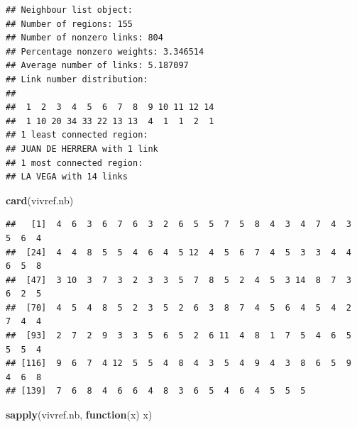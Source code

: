 \documentclass[11pt,]{article}
\newenvironment{Shaded}{\begin{snugshade}}{\end{snugshade}}
\newcommand{\KeywordTok}[1]{\textcolor[rgb]{0.13,0.29,0.53}{\textbf{#1}}}
\newcommand{\ControlFlowTok}[1]{\textcolor[rgb]{0.13,0.29,0.53}{\textbf{#1}}}
\newcommand{\NormalTok}[1]{#1}
\begin{document}
\begin{verbatim}
## Neighbour list object:
## Number of regions: 155 
## Number of nonzero links: 804 
## Percentage nonzero weights: 3.346514 
## Average number of links: 5.187097 
## Link number distribution:
## 
##  1  2  3  4  5  6  7  8  9 10 11 12 14 
##  1 10 20 34 33 22 13 13  4  1  1  2  1 
## 1 least connected region:
## JUAN DE HERRERA with 1 link
## 1 most connected region:
## LA VEGA with 14 links
\end{verbatim}

\begin{Shaded}
\begin{Highlighting}[]
\KeywordTok{card}\NormalTok{(vivref.nb)}
\end{Highlighting}
\end{Shaded}

\begin{verbatim}
##   [1]  4  6  3  6  7  6  3  2  6  5  5  7  5  8  4  3  4  7  4  3  5  6  4
##  [24]  4  4  8  5  5  4  6  4  5 12  4  5  6  7  4  5  3  3  4  4  6  5  8
##  [47]  3 10  3  7  3  2  3  3  5  7  8  5  2  4  5  3 14  8  7  3  6  2  5
##  [70]  4  5  4  8  5  2  3  5  2  6  3  8  7  4  5  6  4  5  4  2  7  4  4
##  [93]  2  7  2  9  3  3  5  6  5  2  6 11  4  8  1  7  5  4  6  5  5  5  4
## [116]  9  6  7  4 12  5  5  4  8  4  3  5  4  9  4  3  8  6  5  9  4  6  8
## [139]  7  6  8  4  6  6  4  8  3  6  5  4  6  4  5  5  5
\end{verbatim}

\begin{Shaded}
\begin{Highlighting}[]
\KeywordTok{sapply}\NormalTok{(vivref.nb, }\ControlFlowTok{function}\NormalTok{(x) x)}
\end{Highlighting}
\end{Shaded}
\end{document}
